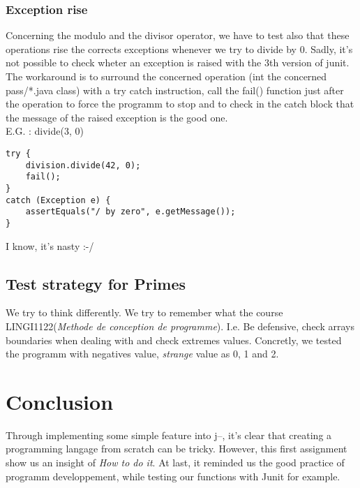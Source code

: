 \documentclass[10pt,a4paper]{article}
\begin{document}
\subsubsection{Exception rise}
	Concerning the modulo and the divisor operator, we have to test also that these operations rise the corrects exceptions whenever we try to divide by 0. Sadly, it's not possible to check wheter an exception is raised with the 3th version of junit. The workaround is to surround the concerned operation (int the concerned pass/*.java class) with a try catch instruction, call the fail() function just after the operation to force the programm to stop and to check  in the catch block that the message of the raised exception is the good one.\\ 
	E.G. : divide(3, 0)
\begin{lstlisting}
try {
	division.divide(42, 0);
	fail();
}
catch (Exception e) {
	assertEquals("/ by zero", e.getMessage());
}
\end{lstlisting}

I know, it's nasty :-/

\subsection{Test strategy for Primes}
We try to think differently. We try to remember what the course LINGI1122(\textit{Methode de conception de programme}). I.e. Be defensive, check arrays boundaries when dealing with and check extremes values. Concretly, we tested the programm with negatives value, \textit{strange} value as 0, 1 and 2. 
\section{Conclusion}

Through implementing some simple feature into j--, it's clear that creating a programming langage from scratch can be tricky. However, this first assignment show us an insight of \textit{How to do it}. At last, it reminded us the good practice of programm developpement, while testing our functions with Junit for example.
\end{document}

